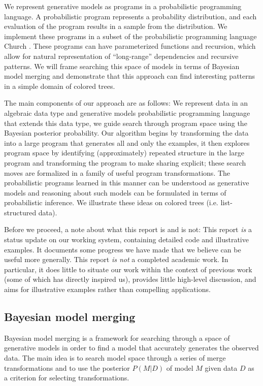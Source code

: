 \documentclass[a4paper,10pt]{article}
\begin{document}
We represent generative models as programs in a probabilistic programming language. A probabilistic program represents a probability distribution, and each evaluation of the program results in a sample from the distribution. We implement these programs in a subset of the probabilistic programming language Church \cite{N.D.Goodman:2008:f2a0d}.  
These programs can have parameterized functions and recursion, which allow for natural representation of ``long-range'' dependencies and recursive patterns.  We will frame searching this space of models in terms of Bayesian model merging \cite{Stolcke:1994:IPG:645515.658235} and demonstrate that this approach can find interesting patterns in a simple domain of colored trees.

The main components of our approach are as follows: We represent data in an algebraic data type and generative models probabilistic programming language that extends this data type, we guide search through program space using the Bayesian posterior probability. Our algorithm begins by transforming the data into a large program that generates all and only the examples, it then explores program space by identifying (approximately) repeated structure in the large program and transforming the program to make sharing explicit; these search moves are formalized in a family of useful program transformations.
The probabilistic programs learned in this manner can be understood as generative models and reasoning about such models can be formulated in terms of probabilistic inference. We illustrate these ideas on colored trees (i.e. list-structured data).

Before we proceed, a note about what this report is and is not: This report \emph{is} a status update on our working system, containing detailed code and illustrative examples. It documents some progress we have made that we believe can be useful more generally.
This report \emph{is not} a completed academic work. In particular, it does little to situate our work within the context of previous work (some of which has  directly inspired us), provides little high-level discussion, and aims for illustrative examples rather than compelling applications.

\subsection{Bayesian model merging}

Bayesian model merging is a framework for searching through a space of generative models in order to find a model that accurately generates the observed data.  The main idea is to search model space through a series of merge transformations and to use the posterior $P(M|D)$ of model $M$ given data $D$ as a criterion for selecting transformations.
\end{document}
